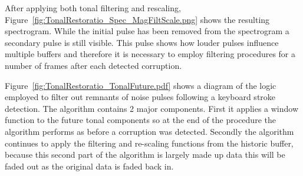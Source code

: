 After applying both tonal filtering and rescaling, Figure~\ref{fig:TonalRestoratio_Spec_MagFiltScale.png} shows the resulting spectrogram. While the initial pulse has been removed from the spectrogram a secondary pulse is still visible. This pulse shows how louder pulses influence multiple buffers and therefore it is necessary to employ filtering procedures for a number of frames after each detected corruption.

Figure~\ref{fig:TonalRestoratio_TonalFuture.pdf} shows a diagram of the logic employed to filter out remnants of noise pulses following a keyboard stroke detection. The algorithm contains 2 major components. First it applies a window function to the future tonal components so at the end of the procedure the algorithm performs as before a corruption was detected. Secondly the algorithm continues to apply the filtering and re-scaling functions from the historic buffer, because this second part of the algorithm is largely made up data this will be faded out as the original data is faded back in.

